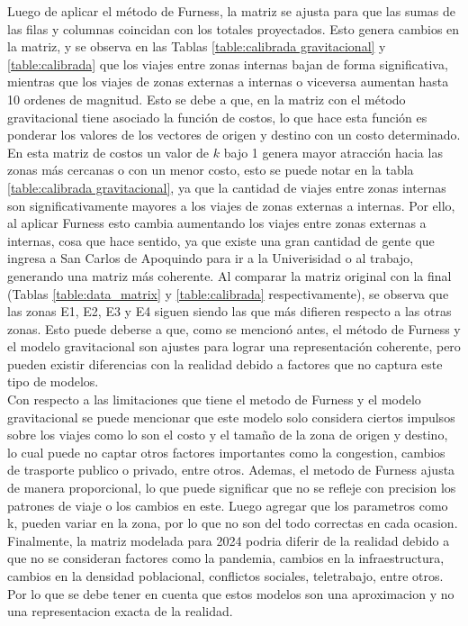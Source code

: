 \documentclass[letterpaper,12pt]{article}
\begin{document}
Luego de aplicar el método de Furness, la matriz se ajusta para que las sumas de las filas y columnas coincidan con los totales proyectados. Esto genera cambios en la matriz, y se observa en las Tablas \ref{table:calibrada gravitacional} y \ref{table:calibrada} que los viajes entre zonas internas bajan de forma significativa, mientras que los viajes de zonas externas a internas o viceversa aumentan hasta 10 ordenes de magnitud. Esto se debe a que, en la matriz con el método gravitacional tiene asociado la función de costos, lo que hace esta función es ponderar los valores de los vectores de origen y destino con un costo determinado. En esta matriz de costos un valor de $k$ bajo 1 genera mayor atracción hacia las zonas más cercanas o con un menor costo, esto se puede notar en la tabla \ref{table:calibrada gravitacional}, ya que la cantidad de viajes entre zonas internas son significativamente mayores a los viajes de zonas externas a internas. Por ello, al aplicar Furness esto cambia aumentando los viajes entre zonas externas a internas, cosa que hace sentido, ya que existe una gran cantidad de gente que ingresa a San Carlos de Apoquindo para ir a la Univerisidad o al trabajo, generando una matriz más coherente. Al comparar la matriz original con la final (Tablas \ref{table:data_matrix} y \ref{table:calibrada} respectivamente), se observa que las zonas E1, E2, E3 y E4 siguen siendo las que más difieren respecto a las otras zonas. Esto puede deberse a que, como se mencionó antes, el método de Furness y el modelo gravitacional son ajustes para lograr una representación coherente, pero pueden existir diferencias con la realidad debido a factores que no captura este tipo de modelos.\\

Con respecto a las limitaciones que tiene el metodo de Furness y el modelo gravitacional se puede mencionar que este modelo solo considera ciertos impulsos sobre los viajes como lo son el costo y el tamaño de la zona de origen y destino, lo cual puede no captar otros factores importantes como la congestion, cambios de trasporte publico o privado, entre otros. Ademas, el metodo de Furness ajusta de manera proporcional, lo que puede significar que no se refleje con precision los patrones de viaje o los cambios en este. Luego agregar que los parametros como k, pueden variar en la zona, por lo que no son del todo correctas en cada ocasion. \\

Finalmente, la matriz modelada para 2024 podria diferir de la realidad debido a que no se consideran factores como la pandemia, cambios en la infraestructura, cambios en la densidad poblacional, conflictos sociales, teletrabajo, entre otros. Por lo que se debe tener en cuenta que estos modelos son una aproximacion y no una representacion exacta de la realidad.
\end{document}
